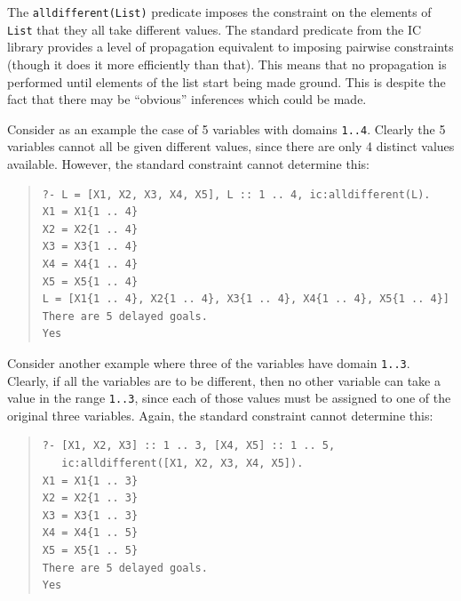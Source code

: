 The \texttt{alldifferent(List)} predicate imposes the constraint on the
elements of \texttt{List} that they all take different values.
The standard 
 predicate from the IC library provides a level of propagation equivalent to
imposing pairwise
%
constraints (though it does it more efficiently than that).  This means that
no propagation is performed until elements of the list start being made
ground.  This is despite the fact that there may be ``obvious'' inferences
which could be made.

Consider as an example the case of 5 variables with domains \texttt{1..4}.
Clearly the 5 variables cannot all be given different values, since there
are only 4 distinct values available.  However, the standard
 constraint
cannot determine this:

\begin{quote}\begin{verbatim}
?- L = [X1, X2, X3, X4, X5], L :: 1 .. 4, ic:alldifferent(L).
X1 = X1{1 .. 4}
X2 = X2{1 .. 4}
X3 = X3{1 .. 4}
X4 = X4{1 .. 4}
X5 = X5{1 .. 4}
L = [X1{1 .. 4}, X2{1 .. 4}, X3{1 .. 4}, X4{1 .. 4}, X5{1 .. 4}]
There are 5 delayed goals.
Yes
\end{verbatim}\end{quote}

Consider another example where three of the variables have domain
\texttt{1..3}.  Clearly, if all the variables are to be different, then no
other variable can take a value in the range \texttt{1..3}, since each of
those values must be assigned to one of the original three variables.
Again, the standard 
 constraint 
cannot determine this:

\begin{quote}\begin{verbatim}
?- [X1, X2, X3] :: 1 .. 3, [X4, X5] :: 1 .. 5,
   ic:alldifferent([X1, X2, X3, X4, X5]).
X1 = X1{1 .. 3}
X2 = X2{1 .. 3}
X3 = X3{1 .. 3}
X4 = X4{1 .. 5}
X5 = X5{1 .. 5}
There are 5 delayed goals.
Yes
\end{verbatim}\end{quote}

